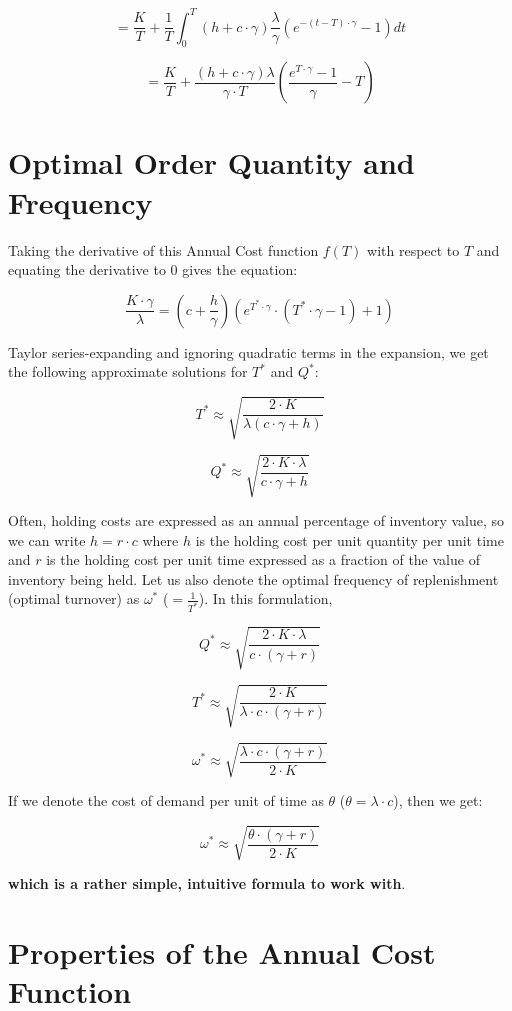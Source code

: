\documentclass[11pt, oneside]{article}   	%
\begin{document}
$$ = \frac {K} {T} + \frac {1} {T} \int_0^T (h + c \cdot \gamma) \frac {\lambda} {\gamma} (e^{-(t-T) \cdot \gamma} - 1) dt$$

$$ = \frac {K} {T} + \frac {(h + c \cdot \gamma) \lambda} {\gamma \cdot T} (\frac {e^{T \cdot \gamma} - 1} {\gamma} - T)$$

\section{Optimal Order Quantity and Frequency}

Taking the derivative of this Annual Cost function $f(T)$ with respect to $T$ and equating the derivative to 0 gives the equation:

$$ \frac {K \cdot \gamma} {\lambda} = (c + \frac {h} {\gamma}) (e^{T^* \cdot \gamma} \cdot (T^* \cdot \gamma - 1) + 1)$$


Taylor series-expanding and ignoring quadratic terms in the expansion, we get the following approximate solutions for $T^*$ and $Q^*$:

$$T^* \approx \sqrt {\frac {2 \cdot K} {\lambda (c \cdot \gamma + h)}}$$

$$Q^* \approx \sqrt {\frac {2 \cdot K \cdot \lambda} {c \cdot \gamma + h}}$$

Often, holding costs are expressed as an annual percentage of inventory value, so we can write $h = r \cdot c$ where $h$ is the holding cost per unit quantity per unit time and $r$ is the holding cost per unit time expressed as a fraction of the value of inventory being held. Let us also denote the optimal frequency of replenishment (optimal turnover) as $\omega^*$ ($= \frac 1 {T^*}$). In this formulation,

$$Q^* \approx \sqrt {\frac {2 \cdot K \cdot \lambda} {c \cdot (\gamma + r)}}$$

$$T^* \approx \sqrt {\frac {2 \cdot K} {\lambda \cdot c \cdot (\gamma + r)}}$$

$$\omega^* \approx \sqrt {\frac {\lambda \cdot c \cdot (\gamma + r)} {2 \cdot K} }$$

If we denote the cost of demand per unit of time as $\theta$ ($\theta = \lambda \cdot c$), then we get:

$$\omega^* \approx \sqrt {\frac {\theta \cdot (\gamma + r)} {2 \cdot K} }$$

{\bf which is a rather simple, intuitive formula to work with}.

\section{Properties of the Annual Cost Function}
\end{document}
